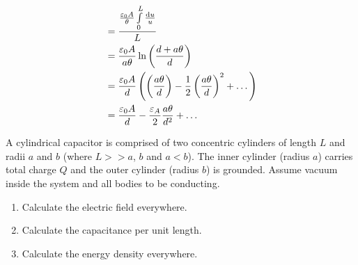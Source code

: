 \documentclass[fleqn, a4paper, 12pt, twoside]{article}
\theoremstyle{definition}
\theoremstyle{theorem}
\begin{document}
\begin{solution}
\begin{align*}
                  & = \frac{\frac{\varepsilon_0 A}{\theta} \int\limits_{0}^{L} \frac{\dif u}{u}}{L}                                                        \\
                  & = \frac{\varepsilon_0 A}{a \theta} \ln \left( \frac{d + a \theta}{d} \right)                                                           \\
                  & = \frac{\varepsilon_0 A}{d} \left( \left( \frac{a \theta}{d} \right) - \frac{1}{2} \left( \frac{a \theta}{d} \right)^2 + \dots \right) \\
                  & = \frac{\varepsilon_0 A}{d} - \frac{\varepsilon_A}{2} \frac{a \theta}{d^2} + \dots
	\end{align*}
\end{solution}

\begin{question}
	A cylindrical capacitor is comprised of two concentric cylinders of length $L$ and radii $a$ and $b$ (where $L >> a$, $b$ and $a < b$).
	The inner cylinder (radius $a$) carries total charge $Q$ and the outer cylinder (radius $b$) is grounded.
	Assume vacuum inside the system and all bodies to be conducting.
	\begin{enumerate}
		\item Calculate the electric field everywhere.
		\item Calculate the capacitance per unit length.
		\item Calculate the energy density everywhere.
	\end{enumerate}
\end{question}
\end{document}
